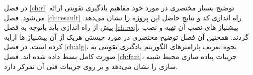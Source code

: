 در فصل \ref{ch:rl} توضیح بسیار مختصری در مورد خود مفاهیم یادگیری تقویتی ارائه می‌شود. فصل \ref{ch:resault} راه اندازی کد و نتایج حاصل این پروژه را نشان می‌دهد. پیش از راه اندازی باید باتوجه به فصل \ref{ch:req}، پیشنیاز های نصب آن تهیه و نصب گردند. همچنین آن فصل توضیح مختصری در مورد چیستی هریک از آن پیشنیاز ها ارایه کرده است. در فصل \ref{ch:alg}، نحوه تعریف پارامترهای الگوریتم یادگیری تقویتی به صورت کامل بسط داده شده اند. فصل \ref{ch:fani}، جزییات پیاده سازی محیط شبیه سازی را نشان می‌دهد و بر روی جزییات فنی آن تمرکز دارد.











